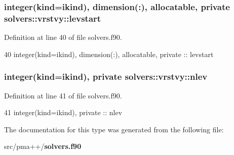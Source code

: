 \subsubsection[{levstart}]{\setlength{\rightskip}{0pt plus 5cm}integer(kind=ikind), dimension(\+:), allocatable, private solvers\+::vrstvy\+::levstart\hspace{0.3cm}{\ttfamily [private]}}\label{structsolvers_1_1vrstvy_acf372c44f25adbf6bf93ed4a97633a99}


Definition at line 40 of file solvers.\+f90.


\begin{DoxyCode}
40         \textcolor{keywordtype}{integer(kind=ikind)}, \textcolor{keywordtype}{dimension(:)}, \textcolor{keywordtype}{allocatable}, \textcolor{keywordtype}{private} :: levstart
\end{DoxyCode}
\subsubsection[{nlev}]{\setlength{\rightskip}{0pt plus 5cm}integer(kind=ikind), private solvers\+::vrstvy\+::nlev\hspace{0.3cm}{\ttfamily [private]}}\label{structsolvers_1_1vrstvy_a85e0b525a218cac0a2ef6c78444f41f0}


Definition at line 41 of file solvers.\+f90.


\begin{DoxyCode}
41         \textcolor{keywordtype}{integer(kind=ikind)}, \textcolor{keywordtype}{private} :: nlev
\end{DoxyCode}


The documentation for this type was generated from the following file\+:\begin{DoxyCompactItemize}
\item 
src/pma++/{\bf solvers.\+f90}\end{DoxyCompactItemize}
